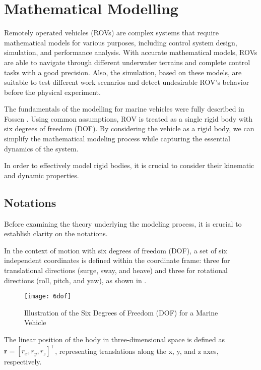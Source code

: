 \chapter{Mathematical Modelling}
\label{chap:mat}


    Remotely operated vehicles (ROVs) are complex systems that require mathematical models for various purposes, 
    including control system design, simulation, and performance analysis. With accurate mathematical models, 
    ROVs are able to navigate through different underwater terrains and complete control tasks with a good 
    precision. Also, the simulation, based on these models, are suitable to test different work scenarios and 
    detect undesirable ROV's behavior before the physical experiment.   
    
    The fundamentals of the modelling for marine vehicles were fully described in Fossen \cite{fossen:guidance}.
    Using common assumptions, ROV is treated as a single rigid body with six degrees of freedom (DOF).
    By considering the vehicle as a rigid body, we can simplify the mathematical modeling process while capturing the essential dynamics 
    of the system.

    In order to effectively model rigid bodies, it is crucial to consider their kinematic and dynamic properties.

    \section{Notations}
    
    Before examining the theory underlying the modeling process, 
    it is crucial to establish clarity on the notations. 

    In the context of motion with six degrees of freedom (DOF), 
    a set of six independent coordinates is defined within the 
    coordinate frame: three for translational directions 
    (surge, sway, and heave) and three for rotational directions 
    (roll, pitch, and yaw), as shown in .

    \begin{figure}[H]
        \centering\texttt{[image: 6dof]}
        \caption{Illustration of the Six Degrees of Freedom (DOF) for a Marine Vehicle}
        \label{image:6dof}
    \end{figure}

    The linear position of the body in three-dimensional space is defined as 
    $ \mathbf{r} = [r_x, r_y, r_z]^\top $, representing translations along 
    the x, y, and z axes, respectively. 
    
